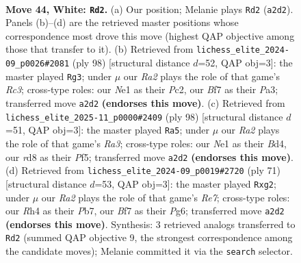 \documentclass[11pt]{article}
\begin{document}
\clearpage

\begin{figure}[p]\centering
\begin{subfigure}{0.46\textwidth}\centering
\resizebox{\linewidth}{!}{%
\newchessgame
\chessboard[
  setfen={3r4/5B2/2k2N2/1b2rp2/1P5R/8/R5P1/3KN3 w - - 3 44},
  showmover=false,
  pgfstyle=straightmove, color=movearrow, markmove={a2-d2}
]}
\caption{}
\end{subfigure}\hfill
\begin{subfigure}{0.46\textwidth}\centering
\resizebox{\linewidth}{!}{%
\newchessgame
\chessboard[
  setfen={5r1k/7p/5P2/p6P/4r1N1/P1R5/2P5/K7 w - - 1 50},
  showmover=false,
  pgfstyle=straightmove, color=movearrow, markmove={c3-g3}
]}
\caption{}
\end{subfigure}
\\[4pt]
\begin{subfigure}{0.46\textwidth}\centering
\resizebox{\linewidth}{!}{%
\newchessgame
\chessboard[
  setfen={4b3/4N1pk/5p2/2P2P2/3B3r/R2K4/7b/8 w - - 0 50},
  showmover=false,
  pgfstyle=straightmove, color=movearrow, markmove={a3-a5}
]}
\caption{}
\end{subfigure}\hfill
\begin{subfigure}{0.46\textwidth}\centering
\resizebox{\linewidth}{!}{%
\newchessgame
\chessboard[
  setfen={1k6/1pn4R/p5p1/8/P1K4P/8/3rr1P1/2R5 b - - 0 36},
  showmover=false,
  pgfstyle=straightmove, color=movearrow, markmove={e2-g2}
]}
\caption{}
\end{subfigure}
\caption{\textbf{Move 44, White: \texttt{Rd2}.} (a) Our position; Melanie plays \texttt{Rd2} (\texttt{a2d2}). Panels (b)--(d) are the retrieved master positions whose correspondence most drove this move (highest QAP objective among those that transfer to it). (b) Retrieved from \texttt{lichess\_elite\_2024-09\_p0026\#2081} (ply 98) [structural distance $d$=52, QAP obj=3]: the master played \texttt{Rg3}; under $\mu$ our \emph{Ra2} plays the role of that game's \emph{Rc3}; cross-type roles: our \emph{N}e1 as their \emph{P}c2, our \emph{B}f7 as their \emph{P}a3; transferred move \texttt{a2d2} \textbf{(endorses this move)}. (c) Retrieved from \texttt{lichess\_elite\_2025-11\_p0000\#2409} (ply 98) [structural distance $d$=51, QAP obj=3]: the master played \texttt{Ra5}; under $\mu$ our \emph{Ra2} plays the role of that game's \emph{Ra3}; cross-type roles: our \emph{N}e1 as their \emph{B}d4, our \emph{r}d8 as their \emph{P}f5; transferred move \texttt{a2d2} \textbf{(endorses this move)}. (d) Retrieved from \texttt{lichess\_elite\_2024-09\_p0019\#2720} (ply 71) [structural distance $d$=53, QAP obj=3]: the master played \texttt{Rxg2}; under $\mu$ our \emph{Ra2} plays the role of that game's \emph{Re7}; cross-type roles: our \emph{R}h4 as their \emph{P}b7, our \emph{B}f7 as their \emph{P}g6; transferred move \texttt{a2d2} \textbf{(endorses this move)}. Synthesis: 3 retrieved analogs transferred to \texttt{Rd2} (summed QAP objective 9, the strongest correspondence among the candidate moves); Melanie committed it via the \texttt{search} selector.}
\label{fig:thought-m86}
\end{figure}
\end{document}

